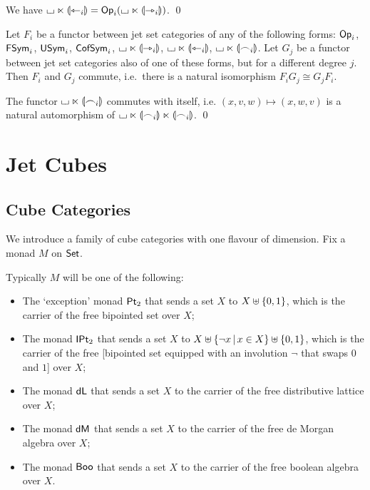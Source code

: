 \documentclass[a4paper]{memoir}
\begin{document}
\begin{corollary} \label{thm:twisted-prism-op}
	We have ${\llcorner\hspace{-.4ex}\lrcorner} \ltimes {\llparenthesis \leftarrowtriangle_i \rrparenthesis} = {\mathsf{Op}}_i({\llcorner\hspace{-.4ex}\lrcorner} \ltimes {\llparenthesis \rightarrowtriangle_i \rrparenthesis})$. \qed
\end{corollary}
\begin{corollary} \label{thm:commute-diff-degree}
	Let $F_i$ be a functor between jet set categories of any of the following forms: ${\mathsf{Op}}_i$, $\mathsf{FSym}_i$, $\mathsf{USym}_i$, $\mathsf{CofSym}_i$, ${\llcorner\hspace{-.4ex}\lrcorner} \ltimes {\llparenthesis \rightarrowtriangle_i \rrparenthesis}$, ${\llcorner\hspace{-.4ex}\lrcorner} \ltimes {\llparenthesis \leftarrowtriangle_i \rrparenthesis}$, ${\llcorner\hspace{-.4ex}\lrcorner} \ltimes {\llparenthesis \frown_i \rrparenthesis}$.
	Let $G_j$ be a functor between jet set categories also of one of these forms, but for a different degree $j$.
	Then $F_i$ and $G_j$ commute, i.e.\ there is a natural isomorphism $F_i G_j \cong G_j F_i$.
\end{corollary}
\begin{corollary} \label{thm:commute-symmetric}
The functor ${\llcorner\hspace{-.4ex}\lrcorner} \ltimes {\llparenthesis \frown_i \rrparenthesis}$ commutes with itself, i.e. $(x, v, w) \mapsto (x, w, v)$ is a natural automorphism of ${\llcorner\hspace{-.4ex}\lrcorner} \ltimes {\llparenthesis \frown_i \rrparenthesis} \ltimes {\llparenthesis \frown_i \rrparenthesis}$. \qed
\end{corollary}

\section{Jet Cubes}
\subsection{Cube Categories} \label{sec:cubes}
We introduce a family of cube categories with one flavour of dimension. Fix a monad $M$ on ${\mathsf{Set}}$.
\begin{example} \label{ex:cube-monads}
	Typically $M$ will be one of the following:
	\begin{itemize}
		\item The `exception' monad ${\mathsf{Pt}_2}$ that sends a set $X$ to $X \uplus \mathopen{}\left\{ 0,1 \right\}\mathclose{}$, which is the carrier of the free bipointed set over $X$;
		\item The monad ${\mathsf{IPt}_2}$ that sends a set $X$ to $X \uplus \mathopen{}\left\{ \lnot x \,\middle|\, x \in X \right\}\mathclose{} \uplus \mathopen{}\left\{ 0, 1 \right\}\mathclose{}$, which is the carrier of the free [bipointed set equipped with an involution $\lnot$ that swaps $0$ and $1$] over $X$;
		\item The monad $\mathsf{dL}$ that sends a set $X$ to the carrier of the free distributive lattice over $X$;
		\item The monad $\mathsf{dM}$ that sends a set $X$ to the carrier of the free de Morgan algebra over $X$;
		\item The monad $\mathsf{Boo}$ that sends a set $X$ to the carrier of the free boolean algebra over $X$.
	\end{itemize}
\end{example}
\end{document}
